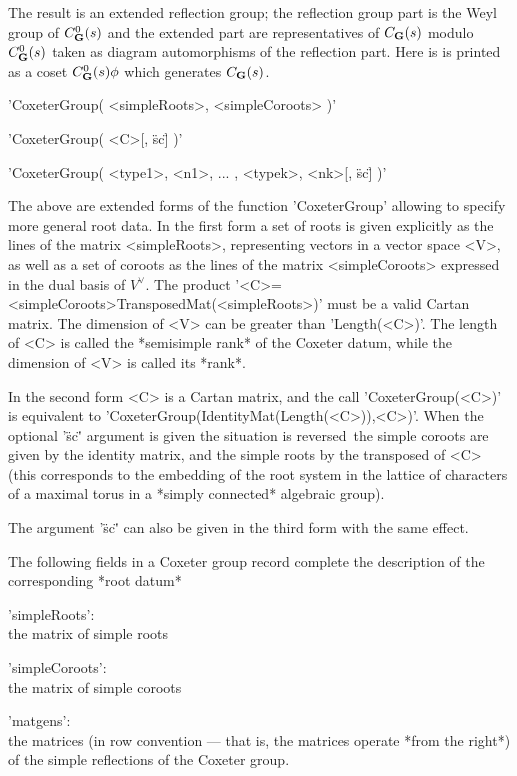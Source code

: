 The  result is an  extended reflection group;  the reflection group part is
the Weyl group of $C_{\mathbf G}^0(s)$ and the extended part are representatives of
$C_{\mathbf G}(s)$  modulo  $C_{\mathbf G}^0(s)$  taken  as  diagram  automorphisms  of the
reflection  part.  Here  is  is  printed  as a coset $C_{\mathbf G}^0(s)\phi$ which
generates $C_{\mathbf G}(s)$.


'CoxeterGroup( <simpleRoots>, <simpleCoroots> )'

'CoxeterGroup( <C>[, \"sc\"] )'

'CoxeterGroup( <type1>, <n1>, ... , <typek>, <nk>[, \"sc\"] )'

The  above are  extended forms  of the  function 'CoxeterGroup' allowing to
specify  more general root data. In the first  form a set of roots is given
explicitly  as the lines of  the matrix <simpleRoots>, representing vectors
in  a vector space  <V>, as well  as a set  of coroots as  the lines of the
matrix <simpleCoroots> expressed in the dual basis of $V^\vee$. The product
'<C>=<simpleCoroots>\*TransposedMat(<simpleRoots>)'  must be a valid Cartan
matrix.  The dimension of <V> can be greater than 'Length(<C>)'. The length
of  <C> is  called the  *semisimple rank*  of the  Coxeter datum, while the
dimension of <V> is called its *rank*.

In the second form <C> is a Cartan matrix, and the call 'CoxeterGroup(<C>)'
is  equivalent  to  'CoxeterGroup(IdentityMat(Length(<C>)),<C>)'.  When the
optional '\"sc\"' argument is given the situation is reversed\:\ the simple
coroots  are given  by the  identity matrix,  and the  simple roots  by the
transposed  of <C> (this corresponds to the embedding of the root system in
the  lattice  of  characters  of  a  maximal  torus in a *simply connected*
algebraic group).

The argument '\"sc\"' can also be given in the third form with the same
effect.

The  following fields in a Coxeter group record complete the description of
the corresponding *root datum*\:

'simpleRoots':\\ the matrix of simple roots

'simpleCoroots':\\ the matrix of simple coroots

'matgens':\\  the matrices  (in row  convention ---  that is,  the matrices
operate *from the right*) of the simple reflections of the Coxeter group.

